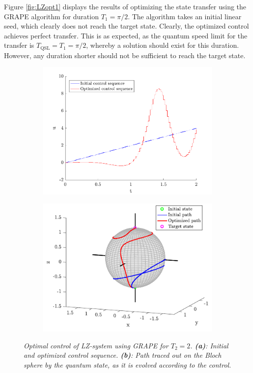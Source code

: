 Figure \ref{fig:LZopt1} displays the results of optimizing the state transfer using the GRAPE algorithm for duration $T_1 = \pi / 2$. The algorithm takes an initial linear seed, which clearly does not reach the target state. Clearly, the optimized control achieves perfect transfer. This is as expected, as the quantum speed limit for the transfer is $T_{\mathrm{QSL}} = T_1 = \pi / 2$, whereby a solution should exist for this duration. However, any duration shorter should not be sufficient to reach the target state.\\ 
\begin{figure}[h!]
\centering %
\begin{subfigure}[b]{0.48\textwidth}
	\caption{}  
  	\includegraphics[width=\textwidth]{Figures/LZcontrol2.pdf}
\end{subfigure}
\hspace{3mm}
\begin{subfigure}[b]{0.48\textwidth}
	\caption{}    
  	\includegraphics[width=\textwidth]{Figures/LZpath2.pdf}
\end{subfigure}

\caption{\textit{Optimal control of LZ-system using GRAPE for $T_2 = 2$. \textbf{(a)}: Initial and optimized control sequence. \textbf{(b)}: Path traced out on the Bloch sphere by the quantum state, as it is evolved according to the control.}}
\label{fig:LZopt2}
\end{figure}
